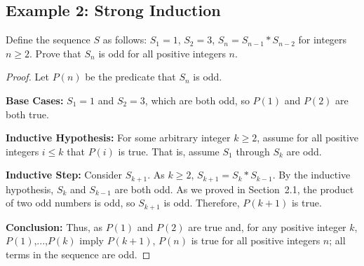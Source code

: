 \documentclass[12pt,letterpaper]{article}
\begin{document}
\subsection{Example 2: Strong Induction}
\begin{mdframed} Define the sequence $S$ as follows: $S_1 = 1$, $S_2 = 3$, $S_n = S_{n-1} * S_{n-2}$ for integers $n \geq 2$. Prove that $S_n$ is odd for all positive integers $n$.

\begin{proof} Let $P(n)$ be the predicate that $S_n$ is odd.

\textbf{Base Cases:} $S_1 = 1$ and $S_2 = 3$, which are both odd, so $P(1)$ and $P(2)$ are both true.

\textbf{Inductive Hypothesis:} For some arbitrary integer $k \geq 2$, assume for all positive integers $i \leq k$ that $P(i)$ is true. That is, assume $S_1$ through $S_k$ are odd.

\textbf{Inductive Step:} Consider $S_{k+1}$. As $k \geq 2$, $S_{k+1} = S_k * S_{k-1}$. By the inductive hypothesis, $S_k$ and $S_{k-1}$ are both odd. As we proved in Section~2.1, the product of two odd numbers is odd, so $S_{k+1}$ is odd. Therefore, $P(k+1)$ is true.

\textbf{Conclusion:} Thus, as $P(1)$ and $P(2)$ are true and, for any positive integer $k$, $P(1)$,...,$P(k)$ imply $P(k+1)$, $P(n)$ is true for all positive integers $n$; all terms in the sequence are odd.
\end{proof}
\end{mdframed}
\end{document}
